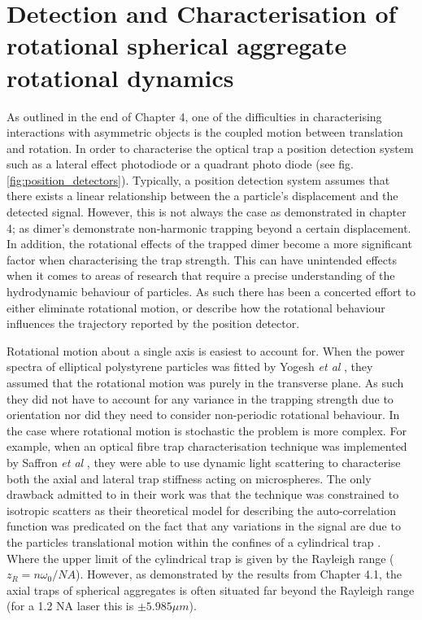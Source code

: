\chapter{Detection and Characterisation of rotational spherical aggregate rotational dynamics}
\label{chapter:simulated_detection}
As outlined in the end of Chapter 4, one of the difficulties 
in characterising interactions with asymmetric objects is 
the coupled motion between translation and rotation. In order
to characterise the optical trap a position detection system 
such as a lateral effect photodiode or a quadrant photo diode
(see fig.\ref{fig:position_detectors}). Typically, a position 
detection system assumes that there exists a linear relationship 
between the a particle's displacement and the detected signal.
However, this is not always the case as demonstrated in chapter
4; as dimer's demonstrate non-harmonic trapping beyond a certain 
displacement. In addition, the rotational effects of the trapped
dimer become a more significant factor when characterising the 
trap strength. This can have unintended effects when it comes to
areas of research that require a precise understanding of the 
hydrodynamic behaviour of particles. As such there has been a 
concerted effort to either eliminate rotational motion, or describe
how the rotational behaviour influences the trajectory reported 
by the position detector. 

Rotational motion about a single axis is easiest to account for.  
When the power spectra of elliptical polystyrene particles was 
fitted by Yogesh \textit{et al} \cite{Yogesha2011PreciseCO}, they 
assumed that the rotational motion was purely in the transverse
plane. As such they did not have to account for any variance in 
the trapping strength due to orientation nor did they need to
consider non-periodic rotational behaviour. In the case where 
rotational motion is stochastic the problem is more complex. 
For example, when an optical fibre trap characterisation 
technique was implemented by Saffron \textit{et al} 
\cite{BarZiv1997, Meller1998}, they were able to use dynamic 
light scattering to characterise both the axial and lateral 
trap stiffness acting on microspheres. The only drawback 
admitted to in their work was that the technique was constrained 
to isotropic scatters as their theoretical model for describing 
the auto-correlation function was predicated on the fact that 
any variations in the signal are due to the particles 
translational motion within the confines of a cylindrical trap 
\cite{BarZiv1997}. Where the upper limit of the cylindrical 
trap is given by the Rayleigh range ($z_R = n\omega_0/NA$).
However, as demonstrated by the results from Chapter 4.1, 
the axial traps of spherical aggregates is often situated 
far beyond the Rayleigh range (for a 1.2 NA laser this is 
$\pm5.985 \mu m$).

